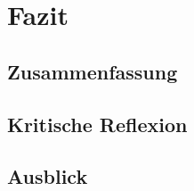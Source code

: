 \section{Fazit}

\subsection{Zusammenfassung}


\subsection{Kritische Reflexion}


\subsection{Ausblick}

